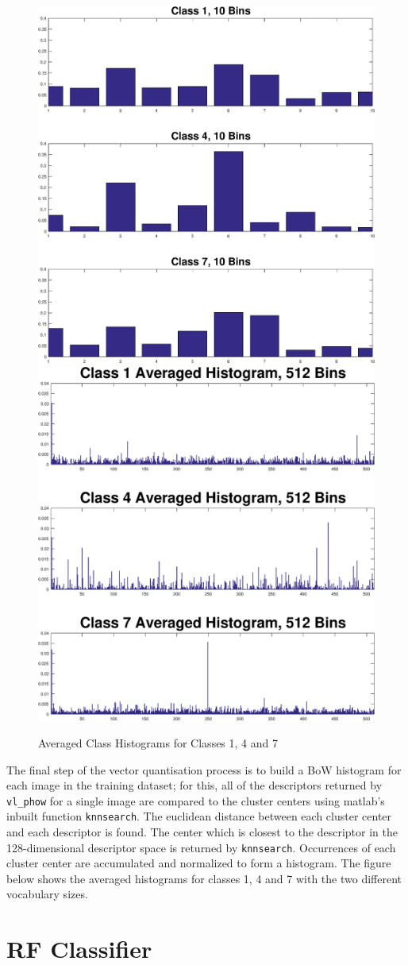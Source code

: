 \documentclass[a4paper,pra,twocolumn,10pt,aps,longbibliography,nobalancelastpage]{article}
\begin{document}
\begin{figure}[H]
	\centering
    \includegraphics[width=0.49\columnwidth]{hist_10}
    \includegraphics[width=0.49\columnwidth]{hist_512}
    \caption{Averaged Class Histograms for Classes 1, 4 and 7}
    \label{fig:hists}
\end{figure}


The final step of the vector quantisation process is to build a BoW histogram for each image in the training dataset; for this, all of the descriptors returned by \texttt{vl\_phow} for a single image are compared to the cluster centers using matlab's inbuilt function \texttt{knnsearch}. The euclidean distance between each cluster center and each descriptor is found. The center which is closest to the descriptor in the 128-dimensional descriptor space is returned by \texttt{knnsearch}. Occurrences of each cluster center are accumulated and normalized to form a histogram. The figure below shows the averaged histograms for classes 1, 4 and 7 with the two different vocabulary sizes. 


\section{RF Classifier}
\end{document}
